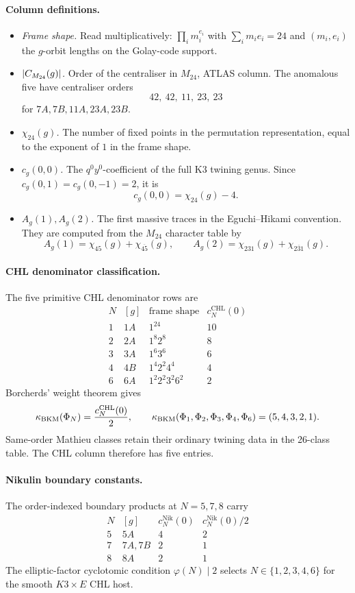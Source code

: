 \paragraph{Column definitions.}
\begin{itemize}
\item \emph{Frame shape.} Read multiplicatively:
$\prod_i m_i^{e_i}$ with $\sum_i m_i e_i=24$ and $(m_i,e_i)$ the
$g$-orbit lengths on the Golay-code support.
\item \emph{$|C_{M_{24}}(g)|$.} Order of the centraliser in $M_{24}$, ATLAS
column. The anomalous five have centraliser orders
\[
  42,\ 42,\ 11,\ 23,\ 23
\]
for \(7A,7B,11A,23A,23B\).
\item \emph{\(\chi_{24}(g)\).} The number of fixed points in the
permutation representation, equal to the exponent of \(1\) in the
frame shape.
\item \emph{\(c_g(0,0)\).} The \(q^0y^0\)-coefficient of the full K3
twining genus. Since \(c_g(0,1)=c_g(0,-1)=2\), it is
\[
  c_g(0,0)=\chi_{24}(g)-4 .
\]
\item \emph{\(A_g(1),A_g(2)\).} The first massive traces in the
Eguchi--Hikami convention. They are computed from the \(M_{24}\)
character table by
\[
  A_g(1)=\chi_{45}(g)+\chi_{\overline{45}}(g),\qquad
  A_g(2)=\chi_{231}(g)+\chi_{\overline{231}}(g).
\]
\end{itemize}

\paragraph{CHL denominator classification.}
The five primitive CHL denominator rows are
\[
\begin{array}{c|c|c|c}
N & [g] & \text{frame shape} & c_N^{\mathrm{CHL}}(0)\\
\hline
1 & 1A & 1^{24} & 10\\
2 & 2A & 1^{8}2^{8} & 8\\
3 & 3A & 1^{6}3^{6} & 6\\
4 & 4B & 1^{4}2^{2}4^{4} & 4\\
6 & 6A & 1^{2}2^{2}3^{2}6^{2} & 2
\end{array}
\]
Borcherds' weight theorem gives
\[
  \kappa_{\mathrm{BKM}}(\Phi_N)=\frac{c_N^{\mathrm{CHL}}(0)}2,
  \qquad
  \kappa_{\mathrm{BKM}}(\Phi_1,\Phi_2,\Phi_3,\Phi_4,\Phi_6)=(5,4,3,2,1).
\]
Same-order Mathieu classes retain their ordinary twining data in the
26-class table. The CHL column therefore has five entries.

\paragraph{Nikulin boundary constants.}
The order-indexed boundary products at \(N=5,7,8\) carry
\[
\begin{array}{c|c|c|c}
N & [g] & c_N^{\mathrm{Nik}}(0) & c_N^{\mathrm{Nik}}(0)/2\\
\hline
5 & 5A & 4 & 2\\
7 & 7A,7B & 2 & 1\\
8 & 8A & 2 & 1
\end{array}
\]
The elliptic-factor cyclotomic condition \(\varphi(N)\mid 2\) selects
\(N\in\{1,2,3,4,6\}\) for the smooth \(K3\times E\) CHL host.

